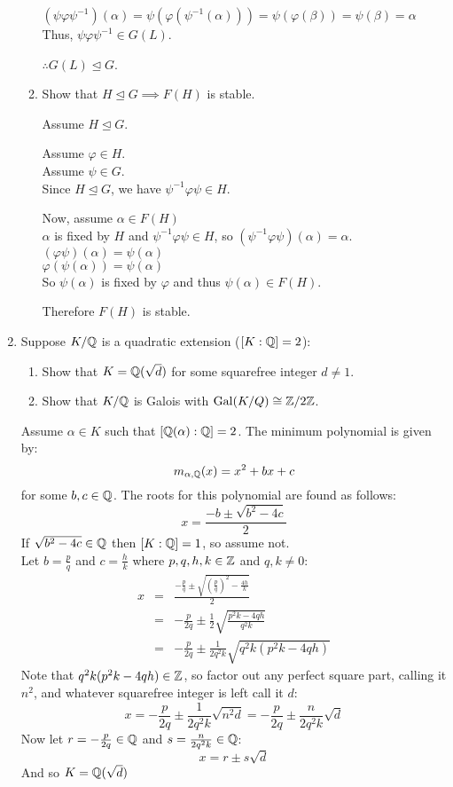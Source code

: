 \documentclass[letterpaper,12pt,fleqn]{article}
\newcommand{\vp}{\varphi}
\renewcommand{\a}{\alpha}
\renewcommand{\a}{\alpha}
\renewcommand{\b}{\beta}
\newcommand{\n}{\trianglelefteq}
\DeclareMathOperator{\Gal}{Gal}
\begin{document}
\begin{enumerate}
\begin{enumerate}
    $(\psi\vp\psi^{-1})(\a)=\psi(\vp(\psi^{-1}(\a)))=\psi(\vp(\b))=\psi(\b)=\a$ \\
    Thus, $\psi\vp\psi^{-1}\in G(L)$.

    $\therefore G(L)\n G$.

  \item Show that $H\n G\implies F(H)$ is stable.
    
    Assume $H\n G$.

    Assume $\vp\in H$. \\
    Assume $\psi\in G$. \\
    Since $H\n G$, we have $\psi^{-1}\vp\psi\in H$.

    Now, assume $\a\in F(H)$ \\
    $\a$ is fixed by $H$ and $\psi^{-1}\vp\psi\in H$, so $(\psi^{-1}\vp\psi)(\a)=\a$. \\
    $(\vp\psi)(\a)=\psi(\a)$ \\
    $\vp(\psi(\a))=\psi(\a)$ \\
    So $\psi(\a)$ is fixed by $\vp$ and thus $\psi(\a)\in F(H)$.

    Therefore $F(H)$ is stable.
  \end{enumerate}

\item Suppose $K/\mathbb{Q}$ is a quadratic extension ($[K:\mathbb{Q}]=2$):
  \begin{enumerate}
  \item Show that $K=\mathbb{Q}(\sqrt{d})$ for some squarefree integer $d\ne1$.
  \item Show that $K/\mathbb{Q}$ is Galois with $\Gal(K/Q)\cong\Z/2\Z$.
  \end{enumerate}

  Assume $\a\in K$ such that $[\Q(\a):\Q]=2$. The minimum polynomial is given by:
  \[m_{\a,\Q}(x)=x^2+bx+c\]
  for some $b,c\in\mathbb{Q}$. The roots for this polynomial are found as follows:
  \[x=\frac{-b\pm\sqrt{b^2-4c}}{2}\]
  If $\sqrt{b^2-4c}\in\mathbb{Q}$ then $[K:\mathbb{Q}]=1$, so assume not. \\
  Let $b=\frac{p}{q}$ and $c=\frac{h}{k}$ where $p,q,h,k\in\mathbb{Z}$ and $q,k\ne0$:
  \begin{eqnarray*}
    x &=& \frac{-\frac{p}{q}\pm\sqrt{\left(\frac{p}{q}\right)^2-\frac{4h}{k}}}{2} \\
    &=& -\frac{p}{2q}\pm\frac{1}{2}\sqrt{\frac{p^2k-4qh}{q^2k}} \\
    &=& -\frac{p}{2q}\pm\frac{1}{2q^2k}\sqrt{q^2k(p^2k-4qh)}
  \end{eqnarray*}
  Note that $q^2k(p^2k-4qh)\in\mathbb{Z}$, so factor out any perfect square part, calling it
  $n^2$, and whatever squarefree integer is left call it $d$:
  \[x=-\frac{p}{2q}\pm\frac{1}{2q^2k}\sqrt{n^2d}=
  -\frac{p}{2q}\pm\frac{n}{2q^2k}\sqrt{d}\]
  Now let $r=-\frac{p}{2q}\in\mathbb{Q}$ and $s=\frac{n}{2q^2k}\in\mathbb{Q}$:
  \[x=r\pm s\sqrt{d}\]
  And so $K=\mathbb{Q}(\sqrt{d})$


\end{enumerate}
\end{document}
